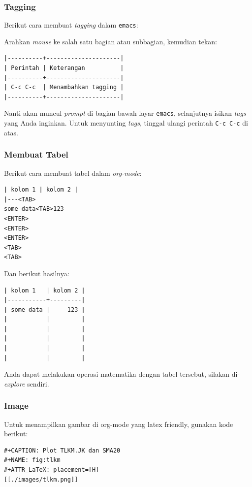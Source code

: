 \documentclass{article}
\begin{document}
\subsubsection{Tagging}
Berikut cara membuat \emph{tagging} dalam \verb=emacs=:

Arahkan \emph{mouse} ke salah satu bagian atau subbagian, kemudian tekan:

\begin{verbatim}
|----------+---------------------|
| Perintah | Keterangan          |
|----------+---------------------|
| C-c C-c  | Menambahkan tagging |
|----------+---------------------|
\end{verbatim}

Nanti akan muncul \emph{prompt} di bagian bawah layar \verb=emacs=, selanjutnya
isikan \emph{tags} yang Anda inginkan. Untuk menyunting \emph{tags}, tinggal 
ulangi perintah \verb=C-c C-c= di atas.

\subsubsection{Membuat Tabel}

Berikut cara membuat tabel dalam \emph{org-mode}:

\begin{verbatim}
| kolom 1 | kolom 2 |
|---<TAB>
some data<TAB>123
<ENTER>
<ENTER>
<ENTER>
<TAB>
<TAB>
\end{verbatim}

Dan berikut hasilnya:

\begin{verbatim}
| kolom 1   | kolom 2 |
|-----------+---------|
| some data |     123 |
|           |         |
|           |         |
|           |         |
|           |         |
|           |         |
\end{verbatim}

Anda dapat melakukan operasi matematika dengan tabel tersebut, silakan
di-\emph{explore} sendiri.

\subsubsection{Image}
Untuk menampilkan gambar di org-mode yang latex friendly, gunakan kode berikut:

\begin{verbatim}
#+CAPTION: Plot TLKM.JK dan SMA20
#+NAME: fig:tlkm
#+ATTR_LaTeX: placement=[H]
[[./images/tlkm.png]]
\end{verbatim}
\end{document}
